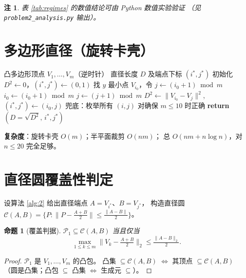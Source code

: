 \documentclass[a4paper,11pt]{article}
\newtheorem{proposition}{命题}
\newtheorem{remark}{注}
\begin{document}
\begin{remark}
表 \ref{tab:regimes} 的数值结论可由 Python 数值实验验证
（见 \texttt{problem2\_analysis.py} 输出）。
\end{remark}

\section{多边形直径（旋转卡壳）}\label{sec:diameter}

\begin{algorithm}[H]
\caption{凸多边形直径}
\label{alg:2}
\begin{algorithmic}[1]
\REQUIRE 凸多边形顶点 $V_1,\dots,V_m$（逆时针）
\ENSURE 直径长度 $D$ 及端点下标 $(i^*,j^*)$
\STATE 初始化 $D^2\leftarrow 0$，$(i^*,j^*)\leftarrow(0,1)$
\STATE 找 $y$ 最小点 $V_{i_0}$，令 $j\leftarrow(i_0+1)\bmod m$
      \STATE $i_0\leftarrow(i_0+1)\bmod m$
   \ELSE
      \STATE $j\leftarrow(j+1)\bmod m$
   \ENDIF
      \STATE $D^2\leftarrow\|V_{i_0}-V_j\|^2$, $(i^*,j^*)\leftarrow(i_0,j)$
   \ENDIF
\ENDWHILE
\STATE 兜底：枚举所有 $(i,j)$ 对确保 $m\le 10$ 时正确
\STATE \textbf{return} $(D=\sqrt{D^2},\,i^*,j^*)$
\end{algorithmic}
\end{algorithm}

\noindent\textbf{复杂度}：旋转卡壳 $O(m)$；半平面裁剪 $O(nm)$；
总 $O(nm+n\log n)$，对 $n\le 20$ 完全足够。

\section{直径圆覆盖性判定}\label{sec:cover}

设算法 \ref{alg:2} 给出直径端点 $A=V_{i^*}$、$B=V_{j^*}$，
构造直径圆 $\mathcal C(A,B)=\{P:\|P-\frac{A+B}{2}\|\le\frac{\|A-B\|}{2}\}$。

\begin{proposition}[覆盖判据]\label{prop:cover}
$\mathcal P_1\subseteq\mathcal C(A,B)$ 当且仅当
\[
\max_{1\le k\le m}\|V_k-\tfrac{A+B}{2}\|_2\le\tfrac{\|A-B\|_2}{2}.
\]
\end{proposition}

\begin{proof}
$\mathcal P_1$ 是 $V_1,\dots,V_m$ 的凸包。
凸集 $\subseteq\mathcal C(A,B)$ $\iff$ 其顶点 $\subseteq\mathcal C(A,B)$
（圆是凸集；凸包 $\subseteq$ 凸集 $\iff$ 生成元 $\subseteq$）。
\end{proof}
\end{document}
